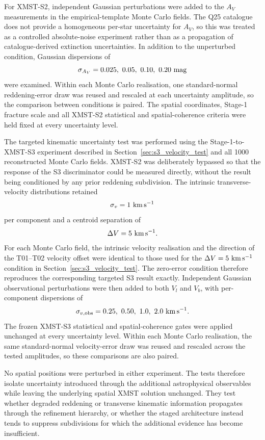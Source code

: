 \documentclass[fleqn,usenatbib]{rasti}
\begin{document}
For XMST-S2, independent Gaussian perturbations were added to the
$A_V$ measurements in the empirical-template Monte Carlo fields. The Q25
catalogue does not provide a homogeneous per-star uncertainty for $A_V$,
so this was treated as a controlled absolute-noise experiment rather than
as a propagation of catalogue-derived extinction uncertainties. In addition
to the unperturbed condition, Gaussian dispersions of
\[
\sigma_{A_V} =
0.025,\ 0.05,\ 0.10,\ 0.20~{\rm mag}
\]
were examined. Within each Monte Carlo realisation, one standard-normal
reddening-error draw was reused and rescaled at each uncertainty amplitude,
so the comparison between conditions is paired. The spatial coordinates,
Stage-1 fracture scale and all XMST-S2 statistical and spatial-coherence
criteria were held fixed at every uncertainty level.

The targeted kinematic uncertainty test was performed using the
Stage-1-to-XMST-S3 experiment described in Section~\ref{sec:s3_velocity_test} and all 1000
reconstructed Monte Carlo fields. XMST-S2 was deliberately bypassed so that
the response of the S3 discriminator could be measured directly, without the
result being conditioned by any prior reddening subdivision. The intrinsic
transverse-velocity distributions retained
\[
\sigma_v = 1~{\rm km\,s^{-1}}
\]
per component and a centroid separation of
\[
\Delta V = 5~{\rm km\,s^{-1}}.
\]
For each Monte Carlo field, the intrinsic velocity realisation and the
direction of the T01--T02 velocity offset were identical to those used for
the $\Delta V=5~{\rm km\,s^{-1}}$ condition in Section~\ref{sec:s3_velocity_test}. The zero-error
condition therefore reproduces the corresponding targeted S3 result exactly.
Independent Gaussian observational perturbations were then added to both
$V_l$ and $V_b$, with per-component dispersions of
\[
\sigma_{v,{\rm obs}} =
0.25,\ 0.50,\ 1.0,\ 2.0~{\rm km\,s^{-1}}.
\]
The frozen XMST-S3 statistical and spatial-coherence gates were applied
unchanged at every uncertainty level. Within each Monte Carlo realisation,
the same standard-normal velocity-error draw was reused and rescaled across
the tested amplitudes, so these comparisons are also paired.

No spatial positions were perturbed in either experiment. The tests
therefore isolate uncertainty introduced through the additional
astrophysical observables while leaving the underlying spatial XMST
solution unchanged. They test whether degraded reddening or transverse
kinematic information propagates through the refinement hierarchy, or
whether the staged architecture instead tends to suppress subdivisions for
which the additional evidence has become insufficient.
\end{document}
